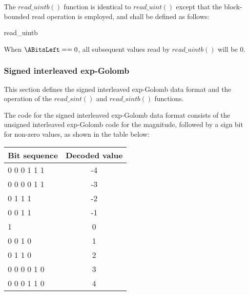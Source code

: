 The $read\_uintb()$ function is identical to $read\_uint()$ except that the block-bounded read
operation is employed, and shall be defined as follows:

\begin{pseudo}{read\_uintb}{}
  \bsEND
\bsEND
{}
\end{pseudo}

\begin{informative}
When $\ABitsLeft==0$, all subsequent values read by $read\_uintb()$ will be 0.
\end{informative}

\subsubsection{Signed interleaved exp-Golomb}
\label{segol}

This section defines the signed interleaved exp-Golomb data format and the operation
of the $read\_sint()$ and $read\_sintb()$ functions.

The code for the signed interleaved exp-Golomb data format consists of the
unsigned interleaved exp-Golomb code for the magnitude, followed by a sign bit
for non-zero values, as shown in the table below:

{
\centering
\begin{tabular}{|l|c|}
\hline
\rowcolor[gray]{0.75}Bit sequence & Decoded value \\
\hline
0 0 0 1 1 1         &  -4\\
0 0 0 0 1 1         &  -3\\
0 1 1 1            &  -2\\
0 0 1 1           &  -1\\
1                 &  0\\
0 0 1 0           &  1\\
0 1 1 0            &  2\\
0 0 0 0 1 0         &  3\\
0 0 0 1 1 0         &  4\\
\hline
\end{tabular}

}

